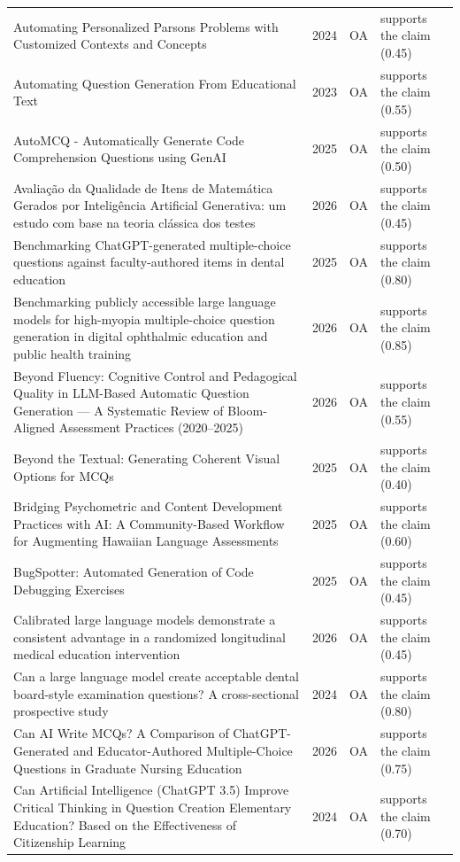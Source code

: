 \begin{longtable}{@{}%
  >{\raggedright\arraybackslash}p{}c%
  >{\raggedright\arraybackslash}p{}%
  >{\raggedright\arraybackslash}p{}@{}}
Automating Personalized Parsons Problems with Customized Contexts and Concepts & 2024 & OA & supports the claim (0.45) \\
Automating Question Generation From Educational Text & 2023 & OA & supports the claim (0.55) \\
AutoMCQ - Automatically Generate Code Comprehension Questions using GenAI & 2025 & OA & supports the claim (0.50) \\
Avaliação da Qualidade de Itens de Matemática Gerados por Inteligência Artificial Generativa: um estudo com base na teoria clássica dos testes & 2026 & OA & supports the claim (0.45) \\
Benchmarking ChatGPT-generated multiple-choice questions against faculty-authored items in dental education & 2025 & OA & supports the claim (0.80) \\
Benchmarking publicly accessible large language models for high-myopia multiple-choice question generation in digital ophthalmic education and public health training & 2026 & OA & supports the claim (0.85) \\
Beyond Fluency: Cognitive Control and Pedagogical Quality in LLM-Based Automatic Question Generation --- A Systematic Review of Bloom-Aligned Assessment Practices (2020--2025) & 2026 & OA & supports the claim (0.55) \\
Beyond the Textual: Generating Coherent Visual Options for MCQs & 2025 & OA & supports the claim (0.40) \\
Bridging Psychometric and Content Development Practices with AI: A Community-Based Workflow for Augmenting Hawaiian Language Assessments & 2025 & OA & supports the claim (0.60) \\
BugSpotter: Automated Generation of Code Debugging Exercises & 2025 & OA & supports the claim (0.45) \\
Calibrated large language models demonstrate a consistent advantage in a randomized longitudinal medical education intervention & 2026 & OA & supports the claim (0.45) \\
Can a large language model create acceptable dental board-style examination questions? A cross-sectional prospective study & 2024 & OA & supports the claim (0.80) \\
Can AI Write MCQs? A Comparison of ChatGPT-Generated and Educator-Authored Multiple-Choice Questions in Graduate Nursing Education & 2026 & OA & supports the claim (0.75) \\
Can Artificial Intelligence (ChatGPT 3.5) Improve Critical Thinking in Question Creation Elementary Education? Based on the Effectiveness of Citizenship Learning & 2024 & OA & supports the claim (0.70) \\

\end{longtable}
